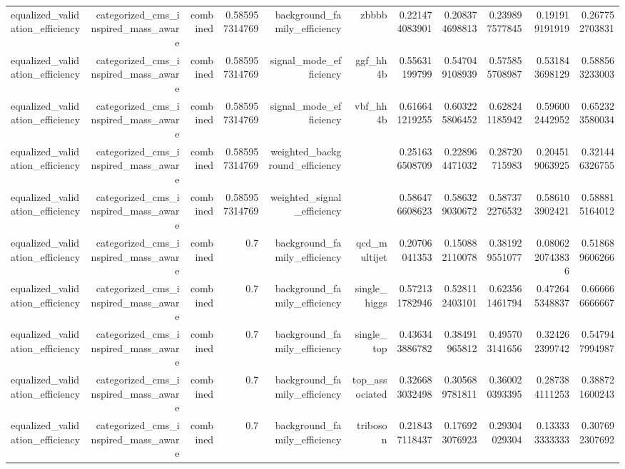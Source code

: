 \begin{table}[htbp]
{\begin{tabular}{lrrrrrrrrrr}
equalized\_validation\_efficiency & categorized\_cms\_inspired\_mass\_aware & combined & 0.585957314769 & background\_family\_efficiency & zbbbb & 0.221474083901 & 0.208374698813 & 0.239897577845 & 0.191919191919 & 0.267752703831 \\
equalized\_validation\_efficiency & categorized\_cms\_inspired\_mass\_aware & combined & 0.585957314769 & signal\_mode\_efficiency & ggf\_hh4b & 0.55631199799 & 0.547049108939 & 0.575855708987 & 0.531843698129 & 0.588563233003 \\
equalized\_validation\_efficiency & categorized\_cms\_inspired\_mass\_aware & combined & 0.585957314769 & signal\_mode\_efficiency & vbf\_hh4b & 0.616641219255 & 0.603225806452 & 0.628241185942 & 0.596002442952 & 0.652323580034 \\
equalized\_validation\_efficiency & categorized\_cms\_inspired\_mass\_aware & combined & 0.585957314769 & weighted\_background\_efficiency &  & 0.251636508709 & 0.228964471032 & 0.28720715983 & 0.204519063925 & 0.321446326755 \\
equalized\_validation\_efficiency & categorized\_cms\_inspired\_mass\_aware & combined & 0.585957314769 & weighted\_signal\_efficiency &  & 0.586476608623 & 0.586329030672 & 0.587372276532 & 0.586103902421 & 0.588815164012 \\
equalized\_validation\_efficiency & categorized\_cms\_inspired\_mass\_aware & combined & 0.7 & background\_family\_efficiency & qcd\_multijet & 0.20706041353 & 0.150882110078 & 0.381929551077 & 0.0806220743836 & 0.518689606266 \\
equalized\_validation\_efficiency & categorized\_cms\_inspired\_mass\_aware & combined & 0.7 & background\_family\_efficiency & single\_higgs & 0.572131782946 & 0.528112403101 & 0.623561461794 & 0.472645348837 & 0.666666666667 \\
equalized\_validation\_efficiency & categorized\_cms\_inspired\_mass\_aware & combined & 0.7 & background\_family\_efficiency & single\_top & 0.436343886782 & 0.38491965812 & 0.495703141656 & 0.324262399742 & 0.547947994987 \\
equalized\_validation\_efficiency & categorized\_cms\_inspired\_mass\_aware & combined & 0.7 & background\_family\_efficiency & top\_associated & 0.326683032498 & 0.305689781811 & 0.360020393395 & 0.287384111253 & 0.388721600243 \\
equalized\_validation\_efficiency & categorized\_cms\_inspired\_mass\_aware & combined & 0.7 & background\_family\_efficiency & triboson & 0.218437118437 & 0.176923076923 & 0.29304029304 & 0.133333333333 & 0.307692307692 \\

\end{tabular}}
\end{table}
